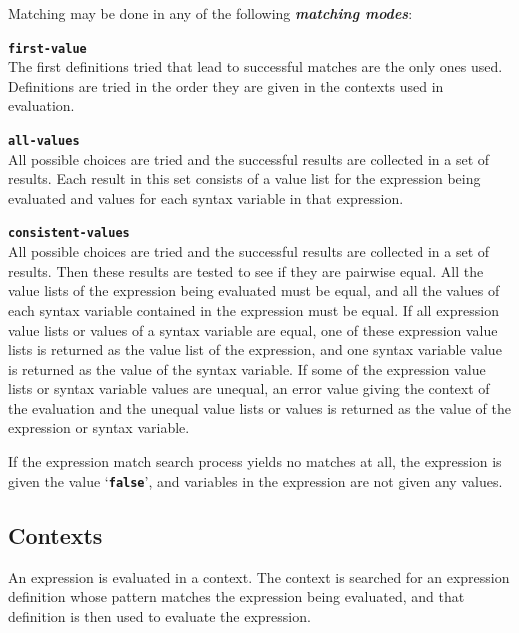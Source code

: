 \documentclass[12pt]{article}
\makeatletter
\newcommand{\TT}[1]{{\tt \bfseries #1}}
\newcommand{\skey}[2]{{\bf \em #1#2}\index{#1}}
\newcommand{\ttkey}[1]{\TT{#1}\index{#1@{\tt #1}}}
\makeatother
\begin{document}
Matching may be done in any of the following \skey{matching mode}s:

\begin{list}{}{}

\item[\ttkey{first-value}]~\\
The first definitions tried that lead to successful matches are the only ones
used.  Definitions are tried in the order they are given in the contexts
used in evaluation.

\item[\ttkey{all-values}]~\\
All possible choices are tried and the
successful results are collected in a set of results.  Each result
in this set consists of a value list for the expression being evaluated
and values for each syntax variable in that expression.

\item[\ttkey{consistent-values}]~\\
All possible choices are tried and the
successful results are collected in a set of results.  Then these results
are tested to see if they are pairwise equal.
All the value lists of the expression
being evaluated must be equal, and all the values of each syntax variable
contained in the expression must be equal.  If all expression value lists or
values of a syntax variable are equal, one of these expression value lists
is returned as the value list of the expression, and one syntax variable value
is returned as the value of the syntax variable.
If some of the expression value lists or syntax variable values are unequal, an
error value giving the context of the evaluation and the unequal value lists
or values is returned as the value of the expression or syntax variable.

\end{list}

If the expression match search process yields no matches at all,
the expression is given the value `\TT{false}', and variables in the
expression are not given any values.

\subsection{Contexts}
\label{CONTEXTS}

An expression is evaluated in a context.  The context is searched
for an expression definition whose pattern matches the expression being
evaluated, and that definition is then used to evaluate the expression.
\end{document}
